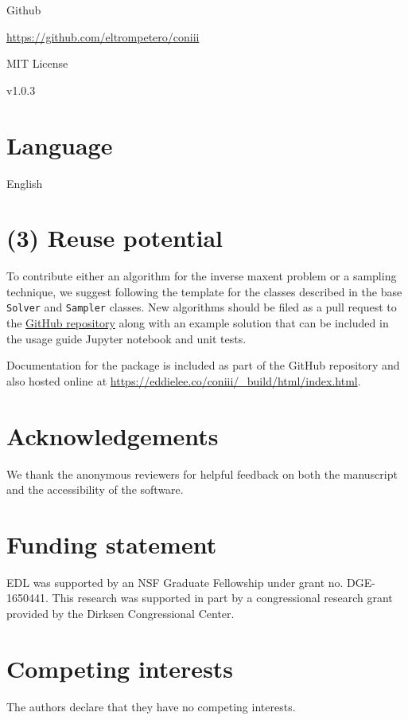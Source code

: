 \documentclass{jors}
\begin{document}
\begin{description}[noitemsep,topsep=0pt]
	\item[Name:] Github
	\item[Persistent identifier:] \url{https://github.com/eltrompetero/coniii}
	\item[Licence:] MIT License
	\item[Version published:] v1.0.3
\end{description}

\section*{Language}
English


\section*{(3) Reuse potential}
To contribute either an algorithm for the inverse maxent problem or a sampling technique, we suggest following the template for the classes described in the base {\tt Solver} and {\tt Sampler} classes. New algorithms should be filed as a pull request to the \href{https://github.com/eltrompetero/coniii}{GitHub repository} along with an example solution that can be included in the usage guide Jupyter notebook and unit tests.

Documentation for the package is included as part of the GitHub repository and also hosted online at \url{https://eddielee.co/coniii/_build/html/index.html}.

\section*{Acknowledgements}
We thank the anonymous reviewers for helpful feedback on both the manuscript and the accessibility of the software.


\section*{Funding statement}
EDL was supported by an NSF Graduate Fellowship under grant no. DGE-1650441. This research was supported in part by a congressional research grant provided by the Dirksen Congressional Center.


\section*{Competing interests}
The authors declare that they have no competing interests.
\end{document}
